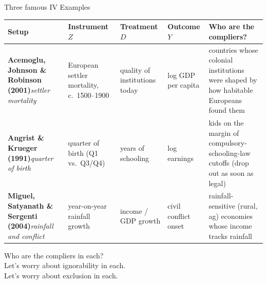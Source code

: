\documentclass[xcolor=dvipsnames]{beamer}
\begin{document}
\begin{frame}{Three famous IV Examples}
\vspace{-0.05in}
\scriptsize
\begin{center}
\renewcommand{\arraystretch}{1.25}
\begin{tabular}{p{1.15in} p{1.35in} p{0.85in} p{0.85in} p{1.45in}}
\toprule
\textbf{Setup} & \textbf{Instrument $Z$} & \textbf{Treatment $D$} & \textbf{Outcome $Y$} & \textbf{Who are the compliers?}\\
\midrule
\textbf{Acemoglu, Johnson \& Robinson (2001)}\newline\textit{settler mortality} & European settler mortality, c.\ 1500--1900 & quality of institutions today & log GDP per capita & countries whose colonial institutions were shaped by how habitable Europeans found them\\[2pt]
\textbf{Angrist \& Krueger (1991)}\newline\textit{quarter of birth} & quarter of birth (Q1 vs.\ Q3/Q4) & years of schooling & log earnings & kids on the margin of compulsory-schooling-law cutoffs (drop out as soon as legal)\\[2pt]
\textbf{Miguel, Satyanath \& Sergenti (2004)}\newline\textit{rainfall and conflict} & year-on-year rainfall growth & income / GDP growth & civil conflict onset & rainfall-sensitive (rural, ag) economies whose income tracks rainfall\\
\bottomrule
\end{tabular}
\end{center}
\medskip
\small
{} Who are the compliers in each? \\
 Let's worry about ignorability in each. \\
 Let's worry about exclusion in each.
\end{frame}
\end{document}
